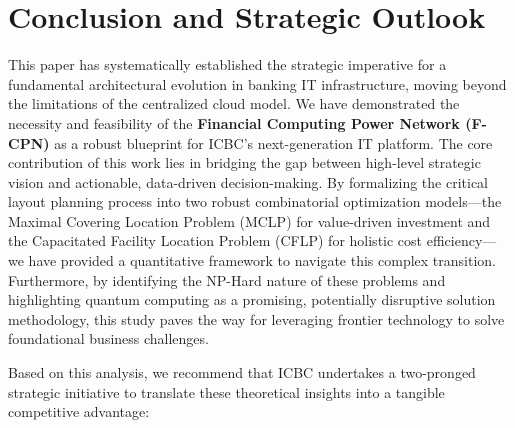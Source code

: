 \documentclass[11pt,a4paper]{article}
\begin{document}
\section{Conclusion and Strategic Outlook}

This paper has systematically established the strategic imperative for a fundamental architectural evolution in banking IT infrastructure, moving beyond the limitations of the centralized cloud model. We have demonstrated the necessity and feasibility of the \textbf{Financial Computing Power Network (F-CPN)} as a robust blueprint for ICBC's next-generation IT platform. The core contribution of this work lies in bridging the gap between high-level strategic vision and actionable, data-driven decision-making. By formalizing the critical layout planning process into two robust combinatorial optimization models---the Maximal Covering Location Problem (MCLP) for value-driven investment and the Capacitated Facility Location Problem (CFLP) for holistic cost efficiency---we have provided a quantitative framework to navigate this complex transition. Furthermore, by identifying the NP-Hard nature of these problems and highlighting quantum computing as a promising, potentially disruptive solution methodology, this study paves the way for leveraging frontier technology to solve foundational business challenges.

Based on this analysis, we recommend that ICBC undertakes a two-pronged strategic initiative to translate these theoretical insights into a tangible competitive advantage:
\end{document}

